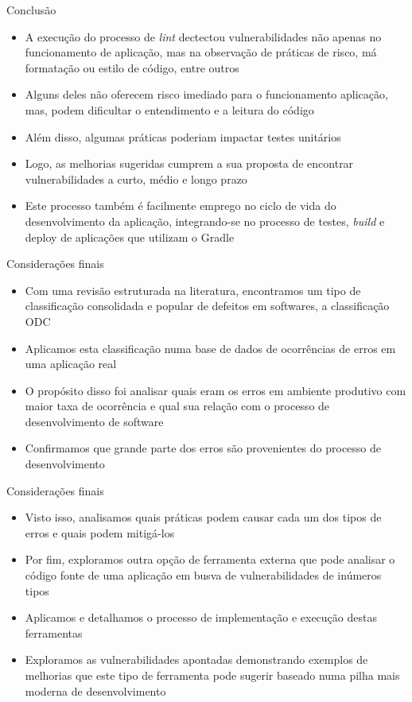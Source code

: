 \documentclass[brazilian]{beamer}
\begin{document}
\begin{frame}{Conclusão}
    \begin{itemize}
        \item A execução do processo de \textit{lint} dectectou vulnerabilidades não apenas no funcionamento de aplicação, mas na observação de práticas de risco, má formatação ou estilo de código, entre outros
        \item Alguns deles não oferecem risco imediado para o funcionamento aplicação, mas, podem dificultar o entendimento e a leitura do código
        \item Além disso, algumas práticas poderiam impactar testes unitários
        \item Logo, as melhorias sugeridas cumprem a sua proposta de encontrar vulnerabilidades a curto, médio e longo prazo
        \item Este processo também é facilmente emprego no ciclo de vida do desenvolvimento da aplicação, integrando-se no processo de testes, \textit{build} e deploy de aplicações que utilizam o Gradle
    \end{itemize}
\end{frame}

\begin{frame}{Considerações finais}
    \begin{itemize}
        \item Com uma revisão estruturada na literatura, encontramos um tipo de classificação consolidada e popular de defeitos em softwares, a classificação ODC
        \item Aplicamos esta classificação numa base de dados de ocorrências de erros em uma aplicação real
        \item O propósito disso foi analisar quais eram os erros em ambiente produtivo com maior taxa de ocorrência e qual sua relação com o processo de desenvolvimento de software
        \item Confirmamos que grande parte dos erros são provenientes do processo de desenvolvimento
    \end{itemize}
\end{frame}

\begin{frame}{Considerações finais}
    \begin{itemize}
        \item Visto isso, analisamos quais práticas podem causar cada um dos tipos de erros e quais podem mitigá-los
        \item Por fim, exploramos outra opção de ferramenta externa que pode analisar o código fonte de uma aplicação em busva de vulnerabilidades de inúmeros tipos
        \item Aplicamos e detalhamos o processo de implementação e execução destas ferramentas
        \item Exploramos as vulnerabilidades apontadas demonstrando exemplos de melhorias que este tipo de ferramenta pode sugerir baseado numa pilha mais moderna de desenvolvimento
    \end{itemize}
\end{frame}
\end{document}
